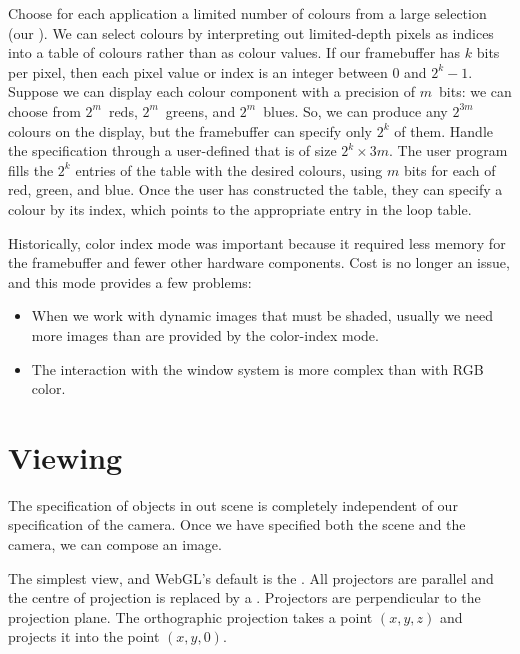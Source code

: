 \documentclass[../notes.tex]{subfiles}
\begin{document}
        Choose for each application a limited number of colours from a large selection
        (our ).
        We can select colours by interpreting out limited-depth pixels as indices into a table
        of colours rather than as colour values.
        If our framebuffer has $k$ bits per pixel, then each pixel value or index is an integer
        between $0$ and $2^k - 1$.
        Suppose we can display each colour component with a precision of $m$~bits:
        we can choose from $2^m$~reds, $2^m$~greens, and $2^m$~blues.
        So, we can produce any $2^{3m}$ colours on the display,
        but the framebuffer can specify only $2^k$ of them.
        Handle the specification through a user-defined 
        that is of size $2^k \times 3m$.
        The user program fills the $2^k$ entries of the table with the desired colours,
        using $m$ bits for each of red, green, and blue.
        Once the user has constructed the table, they can specify a colour by its index,
        which points to the appropriate entry in the loop table.

        Historically, color index mode was important because it required less memory
        for the framebuffer and fewer other hardware components.
        Cost is no longer an issue, and this mode provides a few problems:
        \begin{itemize}
          \item When we work with dynamic images that must be shaded,
            usually we need more images than are provided by the color-index mode.
          \item The interaction with the window system is more complex than with RGB color.
        \end{itemize}

    \section{Viewing}
      The specification of objects in out scene is completely independent of our specification
      of the camera.
      Once we have specified both the scene and the camera, we can compose an image.

      The simplest view, and WebGL's default is the .
      All projectors are parallel and the centre of projection is replaced by a
      .
      Projectors are perpendicular to the projection plane.
      The orthographic projection takes a point $(x, y, z)$ and projects it into the point
      $(x, y, 0)$.
\end{document}
